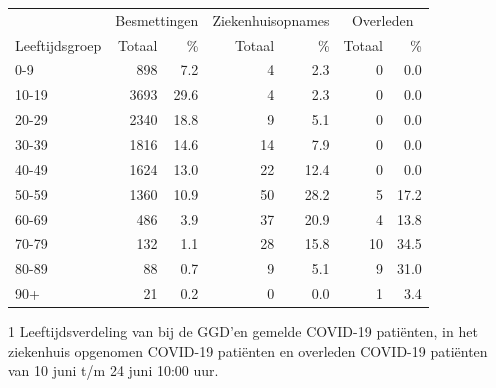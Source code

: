 \documentclass[
  english,
  man,floatsintext]{apa6}
\begin{document}
\begin{table}
\centering\begingroup\fontsize{11}{13}\selectfont

\begin{threeparttable}
\begin{tabular}{lrrrrrr}
\toprule
\multicolumn{1}{c}{ } & \multicolumn{2}{c}{Besmettingen} & \multicolumn{2}{c}{Ziekenhuisopnames} & \multicolumn{2}{c}{Overleden} \\
\cmidrule(l{3pt}r{3pt}){2-3} \cmidrule(l{3pt}r{3pt}){4-5} \cmidrule(l{3pt}r{3pt}){6-7}
Leeftijdsgroep & Totaal & \% & Totaal & \% & Totaal & \%\\
\midrule
0-9 & 898 & 7.2 & 4 & 2.3 & 0 & 0.0\\
10-19 & 3693 & 29.6 & 4 & 2.3 & 0 & 0.0\\
20-29 & 2340 & 18.8 & 9 & 5.1 & 0 & 0.0\\
30-39 & 1816 & 14.6 & 14 & 7.9 & 0 & 0.0\\
40-49 & 1624 & 13.0 & 22 & 12.4 & 0 & 0.0\\
50-59 & 1360 & 10.9 & 50 & 28.2 & 5 & 17.2\\
60-69 & 486 & 3.9 & 37 & 20.9 & 4 & 13.8\\
70-79 & 132 & 1.1 & 28 & 15.8 & 10 & 34.5\\
80-89 & 88 & 0.7 & 9 & 5.1 & 9 & 31.0\\
90+ & 21 & 0.2 & 0 & 0.0 & 1 & 3.4\\
\bottomrule
\end{tabular}
\begin{tablenotes}
\item[1] Leeftijdsverdeling van bij de GGD’en gemelde COVID-19 patiënten, in het ziekenhuis opgenomen COVID-19 patiënten en overleden COVID-19 patiënten van 10 juni t/m 24 juni 10:00 uur.
\end{tablenotes}
\end{threeparttable}
\endgroup{}
\end{table}

\newpage
\end{document}
